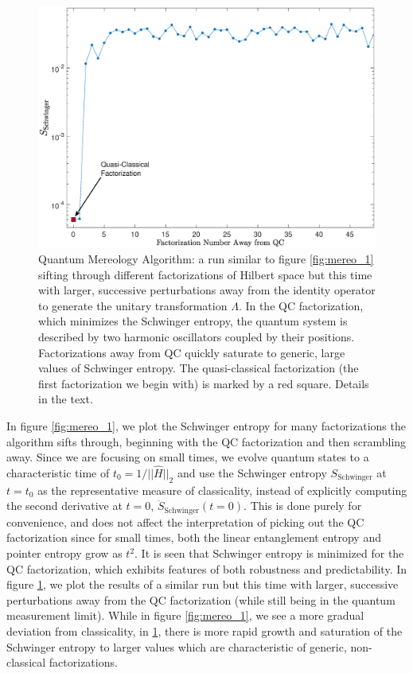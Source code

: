 \documentclass[aps,pra,onecolumn,nofootinbib,notitlepage,11pt,tightenlines]{revtex4-1}
\begin{document}
 \begin{figure}[h]
\includegraphics[width=.68\textwidth]{mereo_2.eps}
\caption{Quantum Mereology Algorithm: a run similar to figure \ref{fig:mereo_1} sifting through different factorizations of Hilbert space but this time with larger, successive perturbations away from the identity operator to generate the unitary transformation $\Lambda$. In the QC factorization, which minimizes the Schwinger entropy, the quantum system is described by two harmonic oscillators coupled by their positions. Factorizations away from QC quickly saturate to generic, large values of Schwinger entropy. The quasi-classical factorization (the first factorization we begin with) is marked by a red square. Details in the text.}
\label{fig:mereo_2}
\end{figure}

 In figure \ref{fig:mereo_1}, we plot the Schwinger entropy for many factorizations the algorithm sifts through, beginning with the QC factorization and then scrambling away. Since we are focusing on small times, we evolve quantum states to a characteristic time of $t_{0} = 1/||\hat{H}||_{2}$ and use the Schwinger entropy $S_{\mathrm{Schwinger}}$ at $t = t_{0}$ as the representative measure of classicality, instead of explicitly computing the second derivative at $t=0$, $\ddot{S}_{\mathrm{Schwinger}}(t=0)$. This is done purely for convenience, and does not affect the interpretation of picking out the QC factorization since for small times, both the linear entanglement entropy and pointer entropy grow as $t^2$. It is seen that Schwinger entropy is minimized for the QC factorization, which exhibits features of both robustness and predictability. In figure \ref{fig:mereo_2}, we plot the results of a similar run but this time with larger, successive perturbations away from the QC factorization (while still being in the quantum measurement limit). While in figure \ref{fig:mereo_1}, we see a more gradual deviation from classicality, in \ref{fig:mereo_2}, there is more rapid growth and saturation of the Schwinger entropy to larger values which are characteristic of generic, non-classical factorizations.
\end{document}
